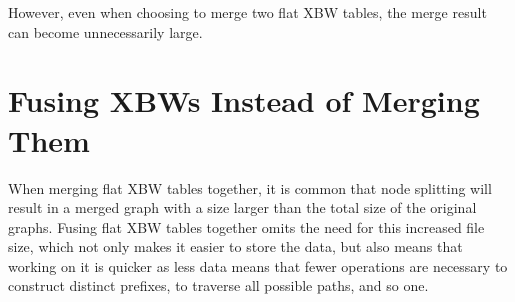 \documentclass[a4paper,12pt,twoside,BCOR=10mm]{scrbook}
\begin{document}
However, even when choosing to merge two flat XBW tables, 
the merge result can become unnecessarily large.


\section{Fusing XBWs Instead of Merging Them}
%

When merging flat XBW tables together, it is common that node splitting 
will result in a merged graph with a size larger than the total size of the 
original graphs. 
Fusing flat XBW tables together omits the need for this increased file size, 
which not only makes it easier to store the data, but also means that working on 
it is quicker as less data means that fewer operations are necessary to construct 
distinct prefixes, to traverse all possible paths, and so one.
\end{document}
